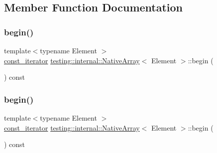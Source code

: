 \subsection{Member Function Documentation}
\mbox{\label{classtesting_1_1internal_1_1_native_array_a3046d93cfa23097e7b7c91f5f982dc78}} 
\subsubsection{\texorpdfstring{begin()}{begin()}\hspace{0.1cm}{\footnotesize\ttfamily [1/3]}}
{\footnotesize\ttfamily template$<$typename Element $>$ \\
\mbox{\hyperlink{classtesting_1_1internal_1_1_native_array_a9ce7c8408460d7158a2870456d134557}{const\+\_\+iterator}} \mbox{\hyperlink{classtesting_1_1internal_1_1_native_array}{testing\+::internal\+::\+Native\+Array}}$<$ Element $>$\+::begin (\begin{DoxyParamCaption}{ }\end{DoxyParamCaption}) const\hspace{0.3cm}{\ttfamily [inline]}}

\mbox{\label{classtesting_1_1internal_1_1_native_array_a3046d93cfa23097e7b7c91f5f982dc78}} 
\subsubsection{\texorpdfstring{begin()}{begin()}\hspace{0.1cm}{\footnotesize\ttfamily [2/3]}}
{\footnotesize\ttfamily template$<$typename Element $>$ \\
\mbox{\hyperlink{classtesting_1_1internal_1_1_native_array_a9ce7c8408460d7158a2870456d134557}{const\+\_\+iterator}} \mbox{\hyperlink{classtesting_1_1internal_1_1_native_array}{testing\+::internal\+::\+Native\+Array}}$<$ Element $>$\+::begin (\begin{DoxyParamCaption}{ }\end{DoxyParamCaption}) const\hspace{0.3cm}{\ttfamily [inline]}}


